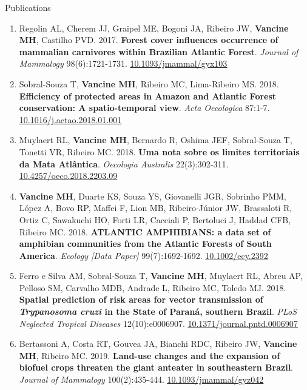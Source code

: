 \documentclass{resume}
\begin{document}
\begin{rSection}{Publications}
\begin{enumerate}
\item Regolin AL, Cherem JJ, Graipel ME, Bogoni JA, Ribeiro JW, \textbf{Vancine MH}, Castilho PVD. 2017. \textbf{Forest cover influences occurrence of mammalian carnivores within Brazilian Atlantic Forest}. \textit{Journal of Mammalogy} 98(6):1721-1731. \href{https://doi.org/10.1093/jmammal/gyx103}{\underline{10.1093/jmammal/gyx103}}

\item Sobral-Souza T, \textbf{Vancine MH}, Ribeiro MC, Lima-Ribeiro MS. 2018. \textbf{Efficiency of protected areas in Amazon and Atlantic Forest conservation: A spatio-temporal view}. \textit{Acta Oecologica} 87:1-7. \href{https://doi.org/10.1016/j.actao.2018.01.001}{\underline{10.1016/j.actao.2018.01.001}}

\item Muylaert RL, \textbf{Vancine MH}, Bernardo R, Oshima JEF, Sobral-Souza T, Tonetti VR, Ribeiro MC. 2018. \textbf{Uma nota sobre os limites territoriais da Mata Atlântica}. \textit{Oecologia Australis} 22(3):302-311. \href{https://doi.org/10.4257/oeco.2018.2203.09}{\underline{10.4257/oeco.2018.2203.09}}

\item \textbf{Vancine MH}, Duarte KS, Souza YS, Giovanelli JGR, Sobrinho PMM, López A, Bovo RP, Maffei F, Lion MB, Ribeiro-Júnior JW, Brassaloti R, Ortiz C, Sawakuchi HO, Forti LR, Cacciali P, Bertoluci J, Haddad CFB, Ribeiro MC. 2018. \textbf{ATLANTIC AMPHIBIANS: a data set of amphibian communities from the Atlantic Forests of South America}. \textit{Ecology [Data Paper]} 99(7):1692-1692. \href{https://doi.org/10.1002/ecy.2392}{\underline{10.1002/ecy.2392}}

\item Ferro e Silva AM, Sobral-Souza T, \textbf{Vancine MH}, Muylaert RL, Abreu AP, Pelloso SM, Carvalho MDB, Andrade L, Ribeiro MC, Toledo MJ. 2018. \textbf{Spatial prediction of risk areas for vector transmission of \textbf{\textit{Trypanosoma cruzi}} in the State of Paraná, southern Brazil}. \textit{PLoS Neglected Tropical Diseases} 12(10):e0006907. \href{https://doi.org/10.1371/journal.pntd.0006907}{\underline{10.1371/journal.pntd.0006907}}

\item Bertassoni A, Costa RT, Gouvea JA, Bianchi RDC, Ribeiro JW, \textbf{Vancine MH}, Ribeiro MC. 2019. \textbf{Land-use changes and the expansion of biofuel crops threaten the giant anteater in southeastern Brazil}. \textit{Journal of Mammalogy} 100(2):435-444. \href{https://doi.org/10.1093/jmammal/gyz042}{\underline{10.1093/jmammal/gyz042}}


\end{enumerate}
\end{rSection}
\end{document}
